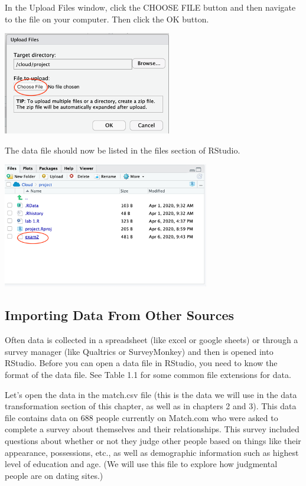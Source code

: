 \documentclass[
]{book}
\begin{document}
In the Upload Files window, click the CHOOSE FILE button and then navigate to the file on your computer. Then click the OK button.

\includegraphics{img/choosefile.png}

The data file should now be listed in the files section of RStudio.

\includegraphics{img/filelist.png}

\hypertarget{importing-data-from-other-sources}{%
\subsection{Importing Data From Other Sources}\label{importing-data-from-other-sources}}

Often data is collected in a spreadsheet (like excel or google sheets) or through a survey manager (like Qualtrics or SurveyMonkey) and then is opened into RStudio. Before you can open a data file in RStudio, you need to know the format of the data file. See Table 1.1 for some common file extensions for data.

Let's open the data in the match.csv file (this is the data we will use in the data transformation section of this chapter, as well as in chapters 2 and 3). This data file contains data on 688 people currently on Match.com who were asked to complete a survey about themselves and their relationships. This survey included questions about whether or not they judge other people based on things like their appearance, possessions, etc., as well as demographic information such as highest level of education and age. (We will use this file to explore how judgmental people are on dating sites.)
\end{document}
